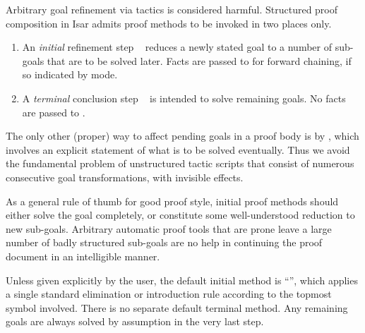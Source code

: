 \begin{isabellebody}
\begin{isamarkuptext}
  Arbitrary goal refinement via tactics is considered harmful.
  Structured proof composition in Isar admits proof methods to be
  invoked in two places only.

  \begin{enumerate}

  \item An \emph{initial} refinement step \hyperlink{command.proof}{\mbox{}}~ reduces a newly stated goal to a number
  of sub-goals that are to be solved later.  Facts are passed to
   for forward chaining, if so indicated by  mode.
  
  \item A \emph{terminal} conclusion step \hyperlink{command.qed}{\mbox{}}~ is intended to solve remaining goals.  No facts are
  passed to .

  \end{enumerate}

  The only other (proper) way to affect pending goals in a proof body
  is by \hyperlink{command.show}{\mbox{}}, which involves an explicit statement of
  what is to be solved eventually.  Thus we avoid the fundamental
  problem of unstructured tactic scripts that consist of numerous
  consecutive goal transformations, with invisible effects.

  \medskip As a general rule of thumb for good proof style, initial
  proof methods should either solve the goal completely, or constitute
  some well-understood reduction to new sub-goals.  Arbitrary
  automatic proof tools that are prone leave a large number of badly
  structured sub-goals are no help in continuing the proof document in
  an intelligible manner.

  Unless given explicitly by the user, the default initial method is
  ``\hyperlink{method.rule}{\mbox{}}'', which applies a single standard elimination
  or introduction rule according to the topmost symbol involved.
  There is no separate default terminal method.  Any remaining goals
  are always solved by assumption in the very last step.


\end{isamarkuptext}
\end{isabellebody}
